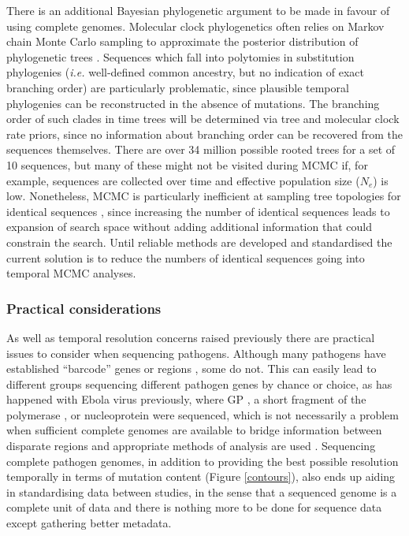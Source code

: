 \documentclass[11pt,oneside,letterpaper]{article}
\begin{document}
There is an additional Bayesian phylogenetic argument to be made in favour of using complete genomes.
Molecular clock phylogenetics often relies on Markov chain Monte Carlo sampling to approximate the posterior distribution of phylogenetic trees \citep{yang_bayesian_1997}.
Sequences which fall into polytomies in substitution phylogenies (\textit{i.e.} well-defined common ancestry, but no indication of exact branching order) are particularly problematic, since plausible temporal phylogenies can be reconstructed in the absence of mutations.
The branching order of such clades in time trees will be determined via tree and molecular clock rate priors, since no information about branching order can be recovered from the sequences themselves.
There are over 34 million possible rooted trees for a set of 10 sequences, but many of these might not be visited during MCMC if, for example, sequences are collected over time and effective population size ($N_{e}$) is low.
Nonetheless, MCMC is particularly inefficient at sampling tree topologies for identical sequences \citep{whidden_quantifying_2015}, since increasing the number of identical sequences leads to expansion of search space without adding additional information that could constrain the search.
Until reliable methods are developed and standardised the current solution is to reduce the numbers of identical sequences going into temporal MCMC analyses.

\subsubsection*{Practical considerations}
As well as temporal resolution concerns raised previously there are practical issues to consider when sequencing pathogens.
Although many pathogens have established ``barcode'' genes or regions \citep{towner_rapid_2004}, some do not.
This can easily lead to different groups sequencing different pathogen genes by chance or choice, as has happened with Ebola virus previously, where GP \citep{georges-courbot_isolation_1997}, a short fragment of the polymerase \citep{leroy_fruit_2005}, or nucleoprotein \citep{rouquet_wild_2005} were sequenced, which is not necessarily a problem when sufficient complete genomes are available to bridge information between disparate regions and appropriate methods of analysis are used \citep{dudas_phylogenetic_2014}.
Sequencing complete pathogen genomes, in addition to providing the best possible resolution temporally in terms of mutation content (Figure \ref{contours}), also ends up aiding in standardising data between studies, in the sense that a sequenced genome is a complete unit of data and there is nothing more to be done for sequence data except gathering better metadata.
\end{document}
